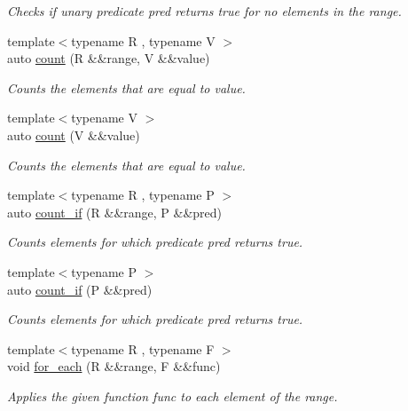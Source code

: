 \begin{DoxyCompactItemize}
\begin{DoxyCompactList}\small\item\em Checks if unary predicate pred returns true for no elements in the range. \end{DoxyCompactList}\item 
{\footnotesize template$<$typename R , typename V $>$ }\\auto \mbox{\hyperlink{namespacerah_aa528865cc4a45d4eb276329554f16b4b}{count}} (R \&\&range, V \&\&value)
\begin{DoxyCompactList}\small\item\em Counts the elements that are equal to value. \end{DoxyCompactList}\item 
{\footnotesize template$<$typename V $>$ }\\auto \mbox{\hyperlink{namespacerah_ae8400202fc4005dbade0f479dd556ec3}{count}} (V \&\&value)
\begin{DoxyCompactList}\small\item\em Counts the elements that are equal to value. \end{DoxyCompactList}\item 
{\footnotesize template$<$typename R , typename P $>$ }\\auto \mbox{\hyperlink{namespacerah_a8e6a379c05d482a52137f5647783fe27}{count\+\_\+if}} (R \&\&range, P \&\&pred)
\begin{DoxyCompactList}\small\item\em Counts elements for which predicate pred returns true. \end{DoxyCompactList}\item 
{\footnotesize template$<$typename P $>$ }\\auto \mbox{\hyperlink{namespacerah_a9e22b56a1f28a353659fed572f33f5a9}{count\+\_\+if}} (P \&\&pred)
\begin{DoxyCompactList}\small\item\em Counts elements for which predicate pred returns true. \end{DoxyCompactList}\item 
{\footnotesize template$<$typename R , typename F $>$ }\\void \mbox{\hyperlink{namespacerah_afe6ed477fd9ab2f873d76a4b50ffac39}{for\+\_\+each}} (R \&\&range, F \&\&func)
\begin{DoxyCompactList}\small\item\em Applies the given function func to each element of the range. \end{DoxyCompactList}\item 

\end{DoxyCompactItemize}
